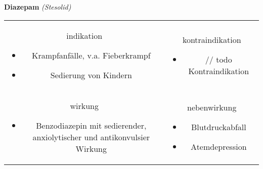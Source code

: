 \begin{frame}{
    \textbf{Diazepam}
    \textit{(Stesolid)}
}
    \begin{tabular}{c c}
        \begin{beamercolorbox}[wd=\boxwidth\textwidth,ht=\boxheight\textheight,sep=1em]{indikation}
            \begin{itemize}
                \item Krampfanfälle, v.a. Fieberkrampf
                \item Sedierung von Kindern
            \end{itemize}
        \end{beamercolorbox} & 
        \begin{beamercolorbox}[wd=\boxwidth\textwidth,ht=\boxheight\textheight,sep=1em]{kontraindikation}
            \begin{itemize}
                \item // todo Kontraindikation 
            \end{itemize}
        \end{beamercolorbox} \\
        \begin{beamercolorbox}[wd=\boxwidth\textwidth,ht=\boxheight\textheight,sep=1em]{wirkung}
            \begin{itemize}
                \item Benzodiazepin mit sedierender, anxiolytischer und antikonvulsier Wirkung
            \end{itemize}
        \end{beamercolorbox} & 
        \begin{beamercolorbox}[wd=\boxwidth\textwidth,ht=\boxheight\textheight,sep=1em]{nebenwirkung}
            \begin{itemize}
                \item Blutdruckabfall
                \item Atemdepression
            \end{itemize}
        \end{beamercolorbox} \\
    \end{tabular}
\end{frame}

